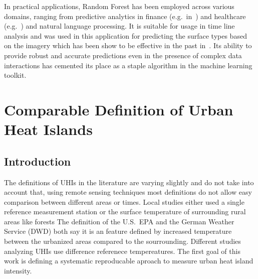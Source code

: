 \documentclass[12pt,a4paper, english]{article}
\begin{document}
In practical applications, Random Forest has been employed across various domains, ranging from predictive analytics in finance (e.g.\ in~\cite{Zhang2022}) and healthcare (e.g.~\cite{Kane2014}) and natural language processing. 
It is suitable for usage in time line analysis and was used in this application for predicting the surface types based on the imagery which has been show to be effective in the past in~\cite{Piao2021}.
%
Its ability to provide robust and accurate predictions even in the presence of complex data interactions has cemented its place as a staple algorithm in the machine learning toolkit.

\newpage
\section{Comparable Definition of Urban Heat Islands}\label{sec:definition}
    \subsection{Introduction}
    The definitions of \glspl{UHI} in the literature are varying slightly and do not take into account that, using remote sensing techniques most definitions do not allow easy comparison between different areas or times.
    Local studies either used a single reference measurement station %
    or the surface temperature of surrounding rural areas like forests %
    The definition of the U.S.~EPA\cite{EPA2008} and the German Weather Service (\gls{DWD}) both say it is an feature defined by increased temperature between the urbanized areas compared to the sourrounding. %
    Different studies analyzing \glspl{UHI} use difference referenece tempereatures.
    The first goal of this work is defining a systematic reproducable aproach to measure urban heat island intensity.
%
\end{document}
